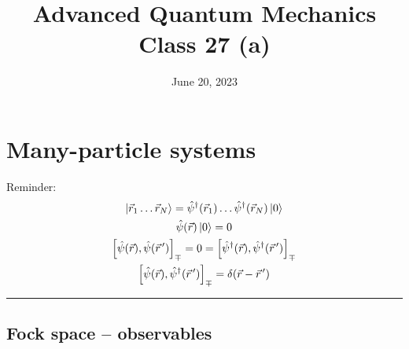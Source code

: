 \documentclass[12pt]{article}
\title{Advanced Quantum Mechanics\\Class 27 (a)}
\date{June 20, 2023}                                           %
\begin{document}
\maketitle

\setcounter{section}{5}


\section{Many-particle systems}
\setcounter{subsection}{2}
Reminder:
\begin{gather*}
\ket{\vec{r}_1\ldots\vec{r}_N} = \hat{\psi}^{\dagger}(\vec{r}_1)\ldots\hat{\psi}^{\dagger}(\vec{r}_N) \ket{0}\label{eq:g50}\\
\hat{\psi}(\vec{r})\ket{0} = 0\label{eq:g51}\\
\left[
\hat{\psi}(\vec{r}),\hat{\psi}(\vec{r}^{\,\prime})
\right]_\mp 
= 0 = 
\left[
\hat{\psi}^{\dagger}(\vec{r}),\hat{\psi}^{\dagger}(\vec{r}^{\,\prime})
\right]_\mp\label{eq:g52}\\
\left[
\hat{\psi}(\vec{r}),\hat{\psi}^{\dagger}(\vec{r}^{\,\prime})
\right]_\mp = \delta(\vec{r} - \vec{r}^{\,\prime})\label{eq:g53}
\end{gather*}
\rule{\textwidth}{1pt}

\subsection{Fock space -- observables}
\end{document}
